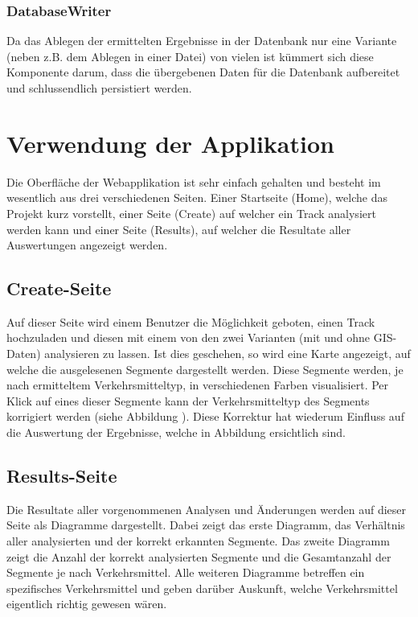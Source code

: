 \subsubsection{DatabaseWriter}
Da das Ablegen der ermittelten Ergebnisse in der Datenbank  nur eine Variante (neben z.B. dem Ablegen  in einer Datei) von vielen ist kümmert sich diese Komponente darum, dass die übergebenen Daten für die Datenbank aufbereitet und schlussendlich persistiert werden.

\section{Verwendung der Applikation}
Die Oberfläche der Webapplikation ist sehr einfach gehalten und besteht im wesentlich aus drei verschiedenen Seiten. Einer Startseite (Home), welche das Projekt kurz vorstellt, einer Seite (Create) auf welcher ein Track analysiert werden kann und einer Seite (Results), auf welcher die Resultate aller Auswertungen angezeigt werden.

\subsection{Create-Seite}
Auf dieser Seite wird einem Benutzer die Möglichkeit geboten, einen Track hochzuladen und diesen mit einem von den zwei Varianten (mit und ohne GIS-Daten) analysieren zu lassen. Ist dies geschehen, so wird eine Karte angezeigt, auf welche die ausgelesenen Segmente dargestellt werden. Diese Segmente werden, je nach ermitteltem Verkehrsmitteltyp, in verschiedenen Farben visualisiert. Per Klick auf eines dieser Segmente kann der Verkehrsmitteltyp des Segments korrigiert werden (siehe Abbildung ). Diese Korrektur hat wiederum Einfluss auf die Auswertung der Ergebnisse, welche in Abbildung  ersichtlich sind.


\subsection{Results-Seite}
Die Resultate aller vorgenommenen Analysen und Änderungen werden auf dieser Seite als Diagramme dargestellt. Dabei zeigt das erste Diagramm, das Verhältnis aller analysierten und der korrekt erkannten Segmente. Das zweite Diagramm zeigt die Anzahl der korrekt analysierten Segmente und die Gesamtanzahl der Segmente je nach Verkehrsmittel. Alle weiteren Diagramme betreffen ein spezifisches Verkehrsmittel und geben darüber Auskunft, welche Verkehrsmittel eigentlich richtig gewesen wären. 

